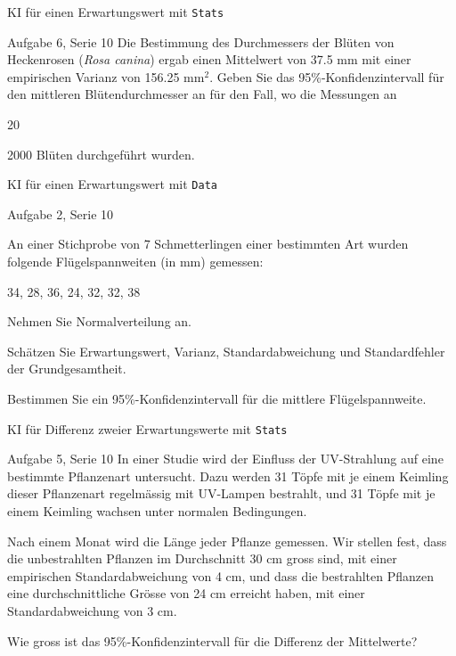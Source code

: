 \documentclass{beamer}
\begin{document}
\begin{frame}{KI für einen Erwartungswert mit \texttt{Stats}}
\begin{beamerboxesrounded}[shadow]{Aufgabe 6, Serie 10}
Die Bestimmung des Durchmessers der Blüten von Heckenrosen 
(\textit{Rosa canina}) ergab einen Mittelwert von 37.5 mm mit 
einer empirischen Varianz von 156.25 mm$^2$. Geben Sie
das 95\%-Konfidenzintervall für den mittleren Blütendurchmesser an 
für den Fall, wo die Messungen an 
\begin{outline}
\item 20 
\item 2000 Blüten durchgeführt wurden.
\end{outline}
\end{beamerboxesrounded}
\end{frame}

\begin{frame}{KI für einen Erwartungswert mit \texttt{Data}}
\begin{beamerboxesrounded}[shadow]{Aufgabe 2, Serie 10}

An einer Stichprobe von 7 Schmetterlingen einer bestimmten Art wurden folgende 
Flügelspannweiten (in mm) gemessen:

\begin{center}
34, 28, 36, 24, 32, 32, 38
\end{center}

Nehmen Sie Normalverteilung an.

\begin{outline}
\item Schätzen Sie Erwartungswert, Varianz, Standardabweichung und Standardfehler der Grundgesamtheit.
\item Bestimmen Sie ein 95\%-Konfidenzintervall für die mittlere Flügelspannweite.
\end{outline}
\end{beamerboxesrounded}
\end{frame}

\begin{frame}{KI für Differenz zweier Erwartungswerte mit \texttt{Stats}}
\begin{beamerboxesrounded}[shadow]{Aufgabe 5, Serie 10}
In einer Studie wird der Einfluss der UV-Strahlung auf eine bestimmte Pflanzenart 
untersucht. Dazu werden 31 Töpfe mit je einem Keimling dieser Pflanzenart regelmässig
mit UV-Lampen bestrahlt, und 31 Töpfe mit je einem Keimling wachsen unter normalen
Bedingungen.

Nach einem Monat wird die Länge jeder Pflanze gemessen. Wir stellen fest, dass die unbestrahlten 
Pflanzen im Durchschnitt 30 cm gross sind, mit einer empirischen Standardabweichung von 4 cm, 
und dass die bestrahlten Pflanzen eine durchschnittliche Grösse von 24 cm erreicht haben, mit 
einer Standardabweichung von 3 cm.

Wie gross ist das 95\%-Konfidenzintervall für die Differenz der Mittelwerte?
\end{beamerboxesrounded}
\end{frame}
\end{document}
